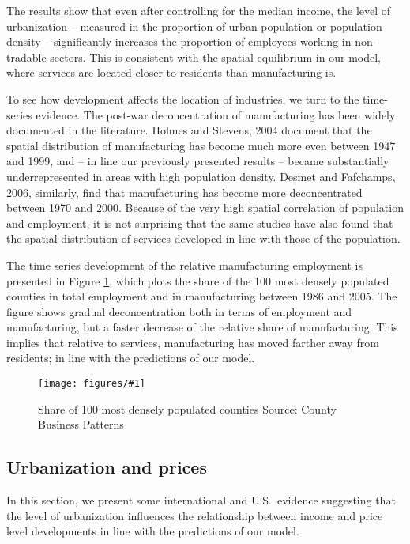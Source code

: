 \documentclass[12pt]{article}
\newcommand{\dofigure}[2]{\begin{figure}
\begin{centering}
\texttt{[image: figures/\#1]}
  \caption{#2\label{fig:#1}}
\end{centering}
\end{figure}}
\begin{document}
The results show that even after controlling for the median income,
the level of urbanization -- measured in the proportion of urban
population or population density -- significantly increases the
proportion of employees working in non-tradable sectors. This is consistent with the spatial equilibrium in our model, where services are located closer to residents than manufacturing is.

To see how development affects the location of industries, we turn to the time-series evidence. The post-war deconcentration of manufacturing has been widely documented in the literature. Holmes and Stevens, 2004 document that the spatial distribution of manufacturing has become much more even between 1947 and 1999, and -- in line our previously presented results -- became substantially underrepresented in areas with high population density. Desmet and Fafchamps, 2006, similarly, find that manufacturing has become more deconcentrated between 1970 and 2000. Because of the very high spatial correlation of population and employment, it is not surprising that the same studies have also found that the spatial distribution of services developed in line with those of the population. 


The time series development of the relative manufacturing employment is presented in Figure \ref{fig:deurbanization}, which plots the share of the 100 most densely populated counties in total employment and in manufacturing between 1986 and 2005. The figure shows gradual deconcentration both in terms of employment and manufacturing, but a faster decrease of the relative share of manufacturing. This implies that relative to services, manufacturing has moved farther away from residents; in line with the predictions of our model.

\dofigure{deurbanization}{Share of 100 most densely populated counties\newline
\small Source: County Business Patterns}

\subsection{Urbanization and prices}
In this section, we present some international and U.S.~evidence suggesting that the level of urbanization influences the relationship between income and price level developments in line with the predictions of our model.
\end{document}
